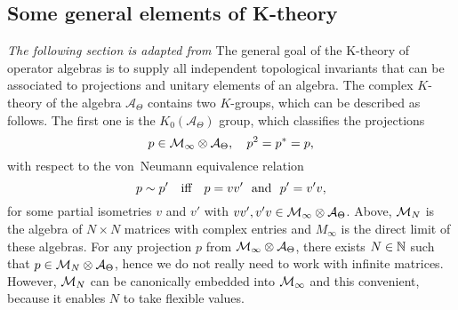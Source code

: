 \documentclass[
    aps,
    prb,
    twocolumn,
    floatfix,
    superscriptaddress,
	10pt
]{revtex4-2}
\begin{document}
\subsection{Some general elements of K-theory}

{\it The following section is adapted from \cite{Liu2020}} The general goal of the K-theory of operator algebras is to supply all independent topological invariants that can be associated to projections and unitary elements of an algebra.
The complex $K$-theory of  the algebra $\mathcal{A}_\Theta$ contains two $K$-groups, which can be described as follows. 
The first one is the $K_0(\mathcal{A}_\Theta)$ group, which classifies the projections
\begin{equation}
p \in {\mathcal M}_\infty \otimes {\mathcal A}_\Theta, \quad p^2 = p^\ast=p,
\end{equation}
with respect to the von~Neumann equivalence relation
\begin{equation}\label{Eq-EquivRelation}
p \sim p' \quad \mbox{iff}  \quad p=vv' \ \  {\rm and} \ \ p' = v'v, 
\end{equation}
for some partial isometries $v$ and $v'$ with  $ vv', v'v \in {\mathcal M}_\infty \otimes {\mathcal A}_\Theta$. Above, ${\mathcal M}_N$ is the algebra of $N \times N$ matrices with complex entries and $M_\infty$ is the direct limit of these algebras. For any projection $p$ from ${\mathcal M}_\infty \otimes {\mathcal A}_\Theta$, there exists $N \in {\mathbb N}$ such that $p \in {\mathcal M}_N \otimes {\mathcal A}_\Theta$, hence we do not really need to work with infinite matrices. However, ${\mathcal M}_N$ can be canonically embedded into ${\mathcal M}_\infty$ and this convenient, because it enables $N$ to take flexible values.

\vspace{0.2cm}
\end{document}
